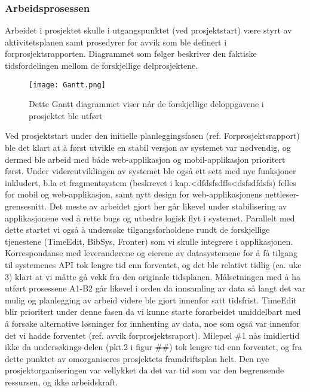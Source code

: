 \documentclass[../main.tex]{subfiles}
\begin{document}
\subsubsection{Arbeidsprosessen}
Arbeidet i prosjektet skulle i utgangspunktet (ved prosjektstart) være styrt av aktivitetsplanen samt prosedyrer for avvik som ble definert i forprosjektsrapporten. Diagrammet som følger beskriver den faktiske tidsfordelingen mellom de forskjellige delprosjektene.
\begin{figure}[H]
  \centering
  \texttt{[image: Gantt.png]}
  \caption{Dette Gantt diagrammet viser når de forskjellige deloppgavene i prosjektet ble utført}
\end{figure}
Ved prosjektstart under den initielle planleggingsfasen (ref. Forprosjektsrapport) ble det klart at å først utvikle en stabil versjon av systemet var nødvendig, og dermed ble arbeid med både web-applikasjon og mobil-applikasjon prioritert først. Under videreutviklingen av systemet ble også ett sett med nye funksjoner inkludert, b.la et fragmentsystem (beskrevet i kap.<dfdsfsdffs<dsfsdfdsfs) felles for mobil og web-applikasjon, samt nytt design for web-applikasjonens nettleser-grensesnitt. Det meste av arbeidet gjort her går likevel under stabilisering av applikasjonene ved å rette bugs og utbedre logisk flyt i systemet. \newline
Parallelt med dette startet vi også å undersøke tilgangsforholdene rundt de forskjellige tjenestene (TimeEdit, BibSys, Fronter) som vi skulle integrere i applikasjonen. Korrespondanse med leverandørene og eierene av datasystemene for å få tilgang til systemenes API tok lengre tid enn forventet, og det ble relativt tidlig (ca. uke 3) klart at vi måtte gå vekk fra den originale tidsplanen.\newline
Målsetningen med å ha utført prosessene A1-B2 går likevel i orden da innsamling av data så langt det var mulig og planlegging av arbeid videre ble gjort innenfor satt tidsfrist. TimeEdit blir prioritert under denne fasen da vi kunne starte forarbeidet umiddelbart med å forsøke alternative løsninger for innhenting av data, noe som også var innenfor det vi hadde forventet (ref. avvik forprosjektsraport). Milepæl \#1 nås imidlertid ikke da undersøkings-delen (pkt.2 i figur \#\#) tok lengre tid enn forventet, og fra dette punktet av omorganiseres prosjektets framdriftsplan helt.\newline
Den nye prosjektorganiseringen var vellykket da det var tid som var den begrensende ressursen, og ikke arbeidskraft.

\newpage
\end{document}

